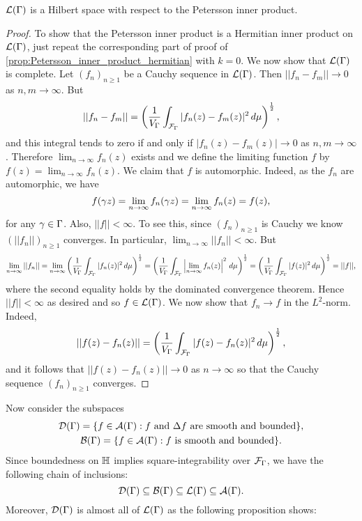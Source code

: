       \begin{theorem}
        $\mathcal{L}(\Gamma)$ is a Hilbert space with respect to the Petersson inner product.
      \end{theorem}
      \begin{proof}
        To show that the Petersson inner product is a Hermitian inner product on $\mathcal{L}(\Gamma)$, just repeat the corresponding part of proof of \cref{prop:Petersson_inner_product_hermitian} with $k = 0$. We now show that $\mathcal{L}(\Gamma)$ is complete. Let $(f_{n})_{n \ge 1}$ be a Cauchy sequence in $\mathcal{L}(\Gamma)$. Then $||f_{n}-f_{m}|| \to 0$ as $n,m \to \infty$. But
        \[
          ||f_{n}-f_{m}|| = \left(\frac{1}{V_{\Gamma}}\int_{\mathcal{F}_{\Gamma}}|f_{n}(z)-f_{m}(z)|^{2}\,d\mu\right)^{\frac{1}{2}},
        \]
        and this integral tends to zero if and only if $|f_{n}(z)-f_{m}(z)| \to 0$ as $n,m \to \infty$. Therefore $\lim_{n \to \infty}f_{n}(z)$ exists and we define the limiting function $f$ by $f(z) = \lim_{n \to \infty}f_{n}(z)$. We claim that $f$ is automorphic. Indeed, as the $f_{n}$ are automorphic, we have
        \[
          f(\gamma z) = \lim_{n \to \infty}f_{n}(\gamma z) = \lim_{n \to \infty}f_{n}(z) = f(z),
        \]
        for any $\gamma \in \Gamma$. Also, $||f|| < \infty$. To see this, since $(f_{n})_{n \ge 1}$ is Cauchy we know $(||f_{n}||)_{n \ge 1}$ converges. In particular, $\lim_{n \to \infty}||f_{n}|| < \infty$. But
        \[
          \lim_{n \to \infty}||f_{n}|| = \lim_{n \to \infty}\left(\frac{1}{V_{\Gamma}}\int_{\mathcal{F}_{\Gamma}}|f_{n}(z)|^{2}\,d\mu\right)^{\frac{1}{2}} = \left(\frac{1}{V_{\Gamma}}\int_{\mathcal{F}_{\Gamma}}\left|\lim_{n \to \infty}f_{n}(z)\right|^{2}\,d\mu\right)^{\frac{1}{2}} = \left(\frac{1}{V_{\Gamma}}\int_{\mathcal{F}_{\Gamma}}|f(z)|^{2}\,d\mu\right)^{\frac{1}{2}} = ||f||,
        \]
        where the second equality holds by the dominated convergence theorem. Hence $||f|| < \infty$ as desired and so $f \in \mathcal{L}(\Gamma)$. We now show that $f_{n} \to f$ in the $L^{2}$-norm. Indeed,
        \[
          ||f(z)-f_{n}(z)|| = \left(\frac{1}{V_{\Gamma}}\int_{\mathcal{F}_{\Gamma}}|f(z)-f_{n}(z)|^{2}\,d\mu\right)^{\frac{1}{2}},
        \]
        and it follows that $||f(z)-f_{n}(z)|| \to 0$ as $n \to \infty$ so that the Cauchy sequence $(f_{n})_{n \ge 1}$ converges.
      \end{proof}

      Now consider the subspaces
      \begin{gather*}
        \mathcal{D}(\Gamma) = \{f \in \mathcal{A}(\Gamma):\text{$f$ and $\Delta f$ are smooth and bounded}\}, \\
        \mathcal{B}(\Gamma) = \{f \in \mathcal{A}(\Gamma):\text{$f$ is smooth and bounded}\}.
      \end{gather*}
      Since boundedness on $\mathbb{H}$ implies square-integrability over $\mathcal{F}_{\Gamma}$, we have the following chain of inclusions:
      \[
        \mathcal{D}(\Gamma) \subseteq \mathcal{B}(\Gamma) \subseteq \mathcal{L}(\Gamma) \subseteq \mathcal{A}(\Gamma).
      \]
      Moreover, $\mathcal{D}(\Gamma)$ is almost all of $\mathcal{L}(\Gamma)$ as the following proposition shows:

